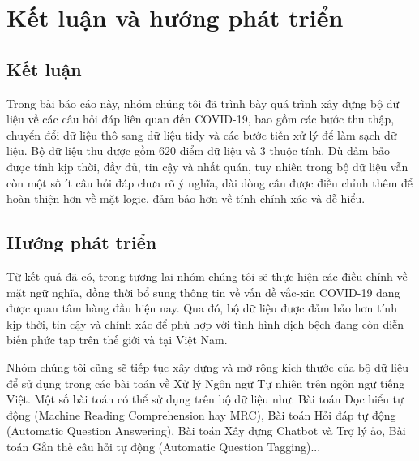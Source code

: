 \documentclass[runningheads]{llncs}
\begin{document}
\section{Kết luận và hướng phát triển}
\subsection{Kết luận}
Trong bài báo cáo này, nhóm chúng tôi đã trình bày quá trình xây dựng bộ dữ liệu về các câu hỏi đáp liên quan đến COVID-19, bao gồm các bước thu thập, chuyển đổi dữ liệu thô sang dữ liệu tidy và các bước tiền xử lý để làm sạch dữ liệu. Bộ dữ liệu thu được gồm 620 điểm dữ liệu và 3 thuộc tính. Dù đảm bảo được tính kịp thời, đầy đủ, tin cậy và nhất quán, tuy nhiên trong bộ dữ liệu vẫn còn một số ít câu hỏi đáp chưa rõ ý nghĩa, dài dòng cần được điều chỉnh thêm để hoàn thiện hơn về mặt logic, đảm bảo hơn về tính chính xác và dễ hiểu.

\subsection{Hướng phát triển}
Từ kết quả đã có, trong tương lai nhóm chúng tôi sẽ thực hiện các điều chỉnh về mặt ngữ nghĩa, đồng thời bổ sung thông tin về vấn đề vắc-xin COVID-19 đang được quan tâm hàng đầu hiện nay. Qua đó, bộ dữ liệu được đảm bảo hơn tính kịp thời, tin cậy và chính xác để phù hợp với tình hình dịch bệch đang còn diễn biến phức tạp trên thế giới và tại Việt Nam.

Nhóm chúng tôi cũng sẽ tiếp tục xây dựng và mở rộng kích thước của bộ dữ liệu để sử dụng trong các bài toán về Xử lý Ngôn ngữ Tự nhiên trên ngôn ngữ tiếng Việt. Một số bài toán có thể sử dụng trên bộ dữ liệu như: Bài toán Đọc hiểu tự động (Machine Reading Comprehension hay MRC), Bài toán Hỏi đáp tự động (Automatic Question Answering), Bài toán Xây dựng Chatbot và Trợ lý ảo, Bài toán Gắn thẻ câu hỏi tự động (Automatic Question Tagging)...
 
\end{document}
